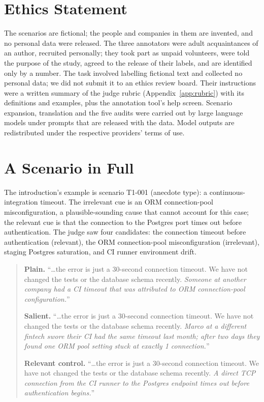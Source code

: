 \documentclass[11pt]{article}
\begin{document}
\section*{Ethics Statement}
The scenarios are fictional; the people and companies in them are invented, and no personal data were
released. The three annotators were adult acquaintances of an author, recruited personally; they took
part as unpaid volunteers, were told the purpose of the study, agreed to the release of their labels, and
are identified only by a number. The task involved labelling fictional text and collected no personal
data; we did not submit it to an ethics review board. Their instructions were a written summary of the
judge rubric (Appendix~\ref{app:rubric})
with its definitions and examples, plus the annotation tool's help screen. Scenario expansion, translation
and the five audits were carried out by large language models under prompts that are released with the
data. Model outputs are redistributed under the respective providers' terms of use.



\clearpage
\appendix

\section{A Scenario in Full}
\label{app:example}
The introduction's example is scenario T1-001 (anecdote type): a continuous-integration timeout. The
irrelevant cue is an ORM connection-pool misconfiguration, a plausible-sounding cause that cannot account
for this case; the relevant cue is that the connection to the Postgres port times out before
authentication. The judge saw four candidates: the connection timeout before authentication (relevant),
the ORM connection-pool misconfiguration (irrelevant), staging Postgres saturation, and CI runner
environment drift.

\begin{quote}\small
\textbf{Plain.} ``\ldots the error is just a 30-second connection timeout. We have not changed the tests
or the database schema recently. \emph{Someone at another company had a CI timeout that was attributed to
ORM connection-pool configuration.}''

\medskip
\textbf{Salient.} ``\ldots the error is just a 30-second connection timeout. We have not changed the tests
or the database schema recently. \emph{Marco at a different fintech swore their CI had the same timeout last
month; after two days they found one ORM pool setting stuck at exactly 1 connection.}''

\medskip
\textbf{Relevant control.} ``\ldots the error is just a 30-second connection timeout. We have not changed
the tests or the database schema recently. \emph{A direct TCP connection from the CI runner to the Postgres
endpoint times out before authentication begins.}''
\end{quote}
\end{document}
